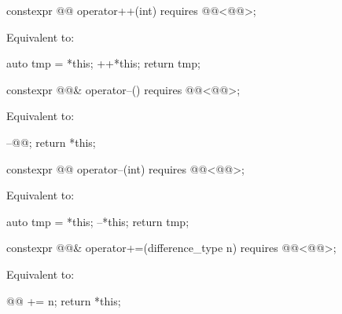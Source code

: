 %
\begin{itemdecl}
constexpr @@ operator++(int) requires @@<@@>;
\end{itemdecl}

\begin{itemdescr}
\pnum
\effects
Equivalent to:
\begin{codeblock}
auto tmp = *this;
++*this;
return tmp;
\end{codeblock}
\end{itemdescr}

%
\begin{itemdecl}
constexpr @@& operator--() requires @@<@@>;
\end{itemdecl}

\begin{itemdescr}
\pnum
\effects
Equivalent to:
\begin{codeblock}
--@@;
return *this;
\end{codeblock}
\end{itemdescr}

%
\begin{itemdecl}
constexpr @@ operator--(int) requires @@<@@>;
\end{itemdecl}

\begin{itemdescr}
\pnum
\effects
Equivalent to:
\begin{codeblock}
auto tmp = *this;
--*this;
return tmp;
\end{codeblock}
\end{itemdescr}

%
\begin{itemdecl}
constexpr @@& operator+=(difference_type n)
  requires @@<@@>;
\end{itemdecl}

\begin{itemdescr}
\pnum
\effects
Equivalent to:
\begin{codeblock}
@@ += n;
return *this;
\end{codeblock}
\end{itemdescr}

